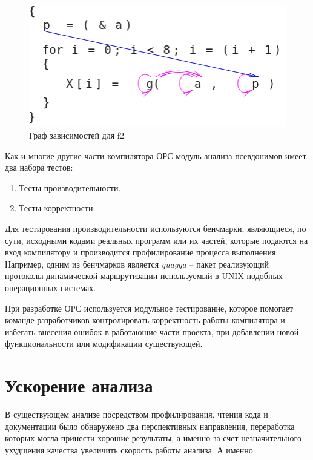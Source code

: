 \begin{figure}[H]
\centering
\includegraphics[width=1\textwidth]{img/opsDepGraphGood_alpha.png}
\caption{Граф зависимостей для f2}
\label{fig:depgraphGood}
\end{figure}

Как и многие другие части компилятора ОРС модуль анализа псевдонимов имеет два набора тестов:
\begin{enumerate}
    \item Тесты производительности.
    \item Тесты корректности.
\end{enumerate}

Для тестирования производительности используются бенчмарки, являющиеся, по сути, исходными кодами реальных программ или их частей, которые подаются на вход компилятору и производится профилирование процесса выполнения. Например, одним из бенчмарков является \textit{quagga} -- пакет реализующий протоколы динамической маршрутизации используемый в UNIX подобных операционных системах.

При разработке ОРС используется модульное тестирование, которое помогает команде разработчиков контролировать корректность работы компилятора и избегать внесения ошибок в работающие части проекта, при добавлении новой функциональности или модификации существующей.

\section{Ускорение анализа}

В существующем анализе посредством профилирования, чтения кода и документации было обнаружено два перспективных направления, переработка которых могла принести хорошие результаты, а именно за счет незначительного ухудшения качества увеличить скорость работы анализа. А именно:

